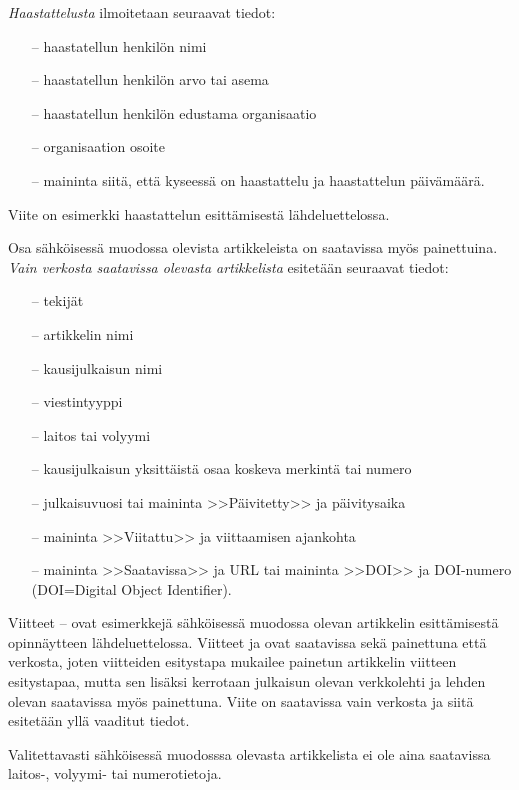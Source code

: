 \documentclass[finnish, 12pt, a4paper, sci, utf8, pdfa]{aaltothesis}
\begin{document}
\textit{Haastattelusta} ilmoitetaan seuraavat tiedot:

\begin{itemize}
\item[--]haastatellun henkilön nimi
\item[--]haastatellun henkilön arvo tai asema
\item[--]haastatellun henkilön edustama organisaatio
\item[--]organisaation osoite
\item[--]maininta siitä, että kyseessä on haastattelu ja haastattelun
päivämäärä. 
\end{itemize}

Viite \cite{haastattelu} on esimerkki 
haastattelun esittämisestä lähdeluettelossa.

Osa sähköisessä muodossa olevista artikkeleista on saatavissa myös
painettuina. \textit{Vain verkosta saatavissa olevasta artikkelista} esitetään
seuraavat tiedot:

\begin{itemize}
\item[--]tekijät
\item[--]artikkelin nimi
\item[--]kausijulkaisun nimi
\item[--]viestintyyppi
\item[--]laitos tai volyymi
\item[--]kausijulkaisun yksittäistä osaa koskeva merkintä tai numero
\item[--]julkaisuvuosi tai maininta >>Päivitetty>> ja päivitysaika
\item[--]maininta >>Viitattu>> ja viittaamisen ajankohta 
\item[--]maininta >>Saatavissa>> ja URL tai 
        maininta >>DOI>> ja DOI-numero (DOI=Digital Object Identifier).
\end{itemize}

Viitteet \cite{Ribeiro}--\cite{kone} ovat esimerkkejä sähköisessä
muodossa olevan artikkelin esittämisestä opinnäytteen
lähdeluettelossa.  Viitteet \cite{Ribeiro} ja \cite{Stieber} ovat
saatavissa sekä painettuna että verkosta, joten viitteiden esitystapa
mukailee painetun artikkelin viitteen esitystapaa, mutta sen lisäksi
kerrotaan julkaisun olevan verkkolehti ja lehden olevan saatavissa
myös painettuna.  Viite \cite{kone} on saatavissa vain verkosta ja
siitä esitetään yllä vaaditut tiedot.

Valitettavasti sähköisessä muodosssa olevasta artikkelista ei ole aina 
saatavissa lai\-tos-, volyymi- tai numerotietoja.
\end{document}
